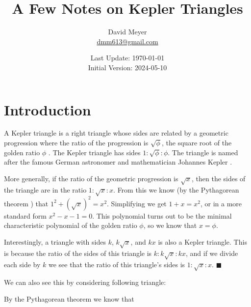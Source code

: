 \documentclass{article}
\title{A Few Notes on Kepler Triangles}
\author{David Meyer \\ \href{mailto:dmm613@gmail.com}
                            {dmm613@gmail.com}}
\date{Last Update: \today \\
	 {\vspace{1.00mm} \small Initial Version: 2024-05-10}}
\theoremstyle{definition}
\begin{document}
\maketitle
%
%
%
\section{Introduction}
\label{section:introduction}
A Kepler triangle is a right triangle whose sides are related by
a geometric progression
\cite{wiki:geometric_series,wikipedia:kepler_triangle} where the
ratio of the progression is $\sqrt{\phi}$, the square root of the
golden ratio $\phi$ \cite{wiki:golden_ratio}. The Kepler triangle
has sides $1:\sqrt{\phi}:\phi$. The triangle is named after the
famous German astronomer and mathematician Johannes Kepler
\cite{wikipedia:johannes_kepler}.

\bigskip
\noindent
More generally, if the ratio of the geometric progression is
$\sqrt{x}$, then the sides of the triangle are in the ratio $1 :
\sqrt{x} : x$. From this we know (by the Pythagorean theorem
\cite{wiki:trig}) that $1^{2} +(\sqrt{x})^{2} =
x^{2}$. Simplifying we get $1 +x = x^{2}$, or in a more standard
form $x^{2}-x-1 = 0$.  This polynomial turns out to be the
minimal characteristic polynomial of the golden ratio $\phi$, so
we know that $x = \phi$.

\bigskip
\noindent
Interestingly, a triangle with sides $k$, $k\sqrt{x}$, and $kx$
is also a Kepler triangle. This is because the ratio of the sides
of this triangle is $k:k\sqrt{x}:kx$, and if we divide each side
by $k$ we see that the ratio of this triangle's sides is
$1:\sqrt{x}:x$. $\blacksquare$

\bigskip
\noindent
We can also see this by considering following triangle:

\bigskip
%
%
\begin{figure}[H]                                                               %
  \centering                                                                    %
  \resizebox{0.25 \textwidth}{!} {                                              %
  }                                                                             %
\end{figure}                                                                    %
%
%
%
\noindent 
By the Pythagorean theorem we know that
\end{document}
